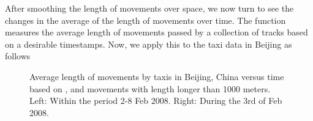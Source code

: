 \documentclass[article]{jss}
\begin{document}
 After smoothing the length of movements over space, we now turn to see the changes in the average of the length of movements over time. The function  measures the average length of movements passed by a collection of tracks based on a desirable timestamps. Now, we apply this to the taxi data in Beijing as follows
\begin{Schunk}
\end{Schunk}
\begin{figure}[!h]
\centering
{}
\caption{Average length of movements by taxis in Beijing, China versus time based on , and movements with length longer than 1000 meters. Left: Within the period 2-8 Feb 2008. Right: During the 3rd of Feb 2008.}
\label{avemovebijing}
\end{figure}
\end{document}
